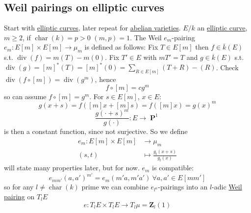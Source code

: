 \documentclass[10pt,]{book}
\numberwithin{equation}{section}
\newcommand{\lb}{[}
\newcommand{\rb}{]}
\newcommand{\ZZ}{\mathbf{Z}}
\DeclareMathOperator{\divisor}{div}
\DeclareMathOperator{\characteristic}{char}
\DeclareMathOperator{\PP}{\mathbf{P}}
\newcommand{\gt}{>}
\newcommand{\amp}{&}
\begin{document}
\subsection[{Weil pairings on elliptic curves}]{Weil pairings on elliptic curves}\label{subsection-27}
\hypertarget{p-299}{}%
Start with \hyperref[def-supersing-isog-ec]{elliptic curves}, later repeat for \hyperref[def-buntes-abvar]{abelian varieties}. \(E/k\) an \hyperref[def-supersing-isog-ec]{elliptic curve}, \(m\ge 2\), if \(\characteristic(k) = p \gt 0\) \((m,p) = 1\). The Weil \(e_m\)-pairing \(e_m \colon E\lb m\rb \times E\lb m \rb \to \mu_m\) is defined as follows: Fix \(T\in E\lb m \rb\) then \(f\in \overline  k (E)\) s.t. \(\divisor(f) = m(T) - m(0)\). Fix \(T' \in E\) with \(mT' = T\) and \(g\in \overline k(E)\) s.t. \(\divisor(g) = \lb m \rb^*(T) = \lb m \rb^*(0)= \sum_{R\in E\lb m \rb} (T+R) - (R)\). Check \(\divisor (f\circ \lb m \rb) = \divisor(g^m)\), hence%
\begin{equation*}
f\circ [m] = c g^m
\end{equation*}
so can assume \(f\circ \lb m \rb = g^m\). For \(s \in E\lb m \rb\), \(x\in E\):%
\begin{equation*}
g(x + s) = f([m]x + [m]s) = f([m]x) = g(x)^m
\end{equation*}
%
\begin{equation*}
\frac{g(\cdot + s)^m}{g(\cdot)} \colon E \to \PP^1
\end{equation*}
is then a constant function, since not surjective. So we define%
\begin{align*}
e_m\colon E[m]\times E[m] \amp\to \mu_m\\
(s,t)\amp \mapsto \frac{g_t(x+s)}{g_t(x)}
\end{align*}
will state many properties later, but for now. \(e_m\) is compatible:%
\begin{equation*}
e_{mm'} (a,a')^{m'} = e_m(m'a, m'a') \ \forall a,a' \in E[mm']
\end{equation*}
so for any \(l\ne \characteristic(k)\) prime we can combine \(e_{l^n}\)-pairings into an \(l\)-adic \hyperref[prop-weil-pair]{Weil pairing} on \(T_l E\)%
\begin{equation*}
e \colon T_l E\times T_lE \to T_l \mu = \ZZ_l(1)
\end{equation*}
%
%
%
\typeout{************************************************}
\typeout{************************************************}
%
\end{document}
